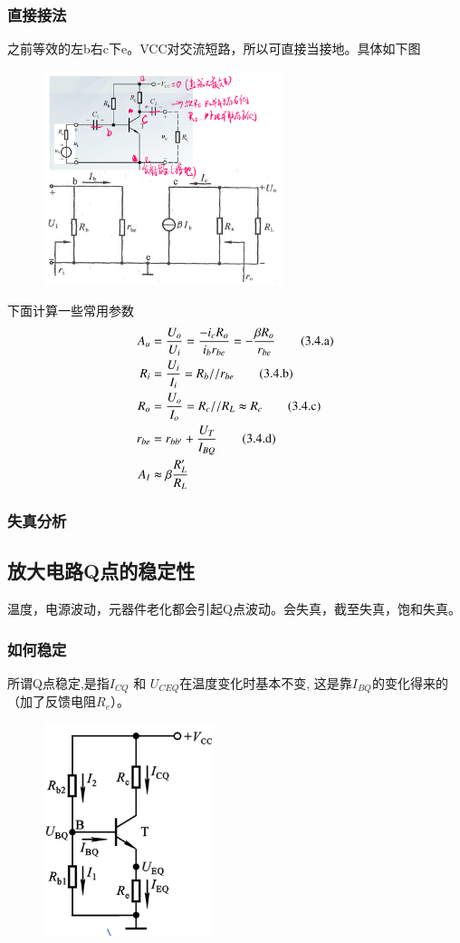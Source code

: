 \subsubsection{直接接法}
之前等效的左b右c下e。VCC对交流短路，所以可直接当接地。具体如下图
        \begin{figure}[H]
            \centering
            \includegraphics[width=7cm]{img/2.11.png}
            \end{figure}
下面计算一些常用参数
\begin{align}
    A_{u}&= \frac{U_{o}}{U_{i}}= \frac{-i_{c}R_{o}}{i_{b}r_{be}}=- \frac{\beta R_{o}}{r_{be}} \tag{3.4.a} \\
    R_i&=\frac{U_i}{I_i}=R_b // r_{be} \tag{3.4.b}\\
    R_o&=\frac{U_o}{I_o}=R_c // R_L\thickapprox R_c \tag{3.4.c}\\
    r_{be}&=r_{bb'}+\frac{U_T}{I_{BQ}} \tag{3.4.d}\\
    A_I&\thickapprox \beta \frac{R_{L}'}{R_L}
\end{align}
\subsubsection{失真分析}
\subsection{放大电路Q点的稳定性}
温度，电源波动，元器件老化都会引起Q点波动。会失真，截至失真，饱和失真。
\subsubsection{如何稳定}
所谓Q点稳定,是指$ I_{CQ} $ 和 $ U_{CEQ} $在温度变化时基本不变,
这是靠$ I_{BQ} $的变化得来的（加了反馈电阻$R_e$）。
        \begin{figure}[H]
            \centering
            \includegraphics[width=5cm]{img/2.13.png}
            \end{figure}

